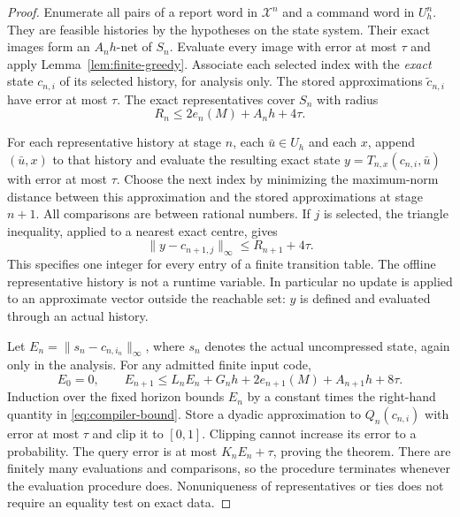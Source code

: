 \documentclass[11pt]{amsart}
\theoremstyle{definition}\newtheorem{definition}[theorem]{Definition}
\theoremstyle{remark}\newtheorem{remark}[theorem]{Remark}
\begin{document}
\begin{proof}
Enumerate all pairs of a report word in $\mathcal X^n$ and a command
word in $U_h^n$. They are feasible histories by the hypotheses on the
state system. Their exact images form an $A_nh$-net of $S_n$.
Evaluate every image with error at most $\tau$ and apply
Lemma~\ref{lem:finite-greedy}. Associate each selected index with the
\emph{exact} state $c_{n,i}$ of its selected history, for analysis only.
The stored approximations $\widetilde c_{n,i}$ have error at most
$\tau$. The exact representatives cover $S_n$ with radius
\begin{equation}\label{eq:compiled-cover}
 R_n\le2e_n(M)+A_nh+4\tau.
\end{equation}

For each representative history at stage $n$, each $\bar u\in U_h$
and each $x$, append $(\bar u,x)$ to that history and evaluate the
resulting exact state
$y=T_{n,x}(c_{n,i},\bar u)$ with error at most $\tau$.
Choose the next index by minimizing the maximum-norm distance between
this approximation and the stored approximations at stage $n+1$.
All comparisons are between rational numbers. If $j$ is selected, the
triangle inequality, applied to a nearest exact centre, gives
\[
 \|y-c_{n+1,j}\|_\infty\le R_{n+1}+4\tau.
\]
This specifies one integer for every entry of a finite transition table.
The offline representative history is not a runtime variable. In
particular no update is applied to an approximate vector outside the
reachable set: $y$ is defined and evaluated through an actual history.

Let $E_n=\|s_n-c_{n,i_n}\|_\infty$, where $s_n$ denotes the actual
uncompressed state, again only in the analysis. For any admitted finite
input code,
\begin{equation}\label{eq:digital-recurrence}
 E_0=0,\qquad
 E_{n+1}\le L_nE_n+G_nh+2e_{n+1}(M)+A_{n+1}h+8\tau.
\end{equation}
Induction over the fixed horizon bounds $E_n$ by a constant times the
right-hand quantity in \eqref{eq:compiler-bound}. Store a dyadic
approximation to $Q_n(c_{n,i})$ with error at most $\tau$ and clip it
to $[0,1]$. Clipping cannot increase its error to a probability.
The query error is at most $K_nE_n+\tau$, proving the theorem.
There are finitely many evaluations and comparisons, so the procedure
terminates whenever the evaluation procedure does. Nonuniqueness of
representatives or ties does not require an equality test on exact data.
\end{proof}
\end{document}
